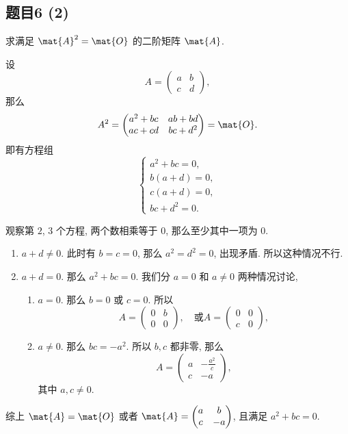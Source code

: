 \newpage
\subsection*{题目6 (2)}
\begin{problem*}
求满足 $\mat{A}^2 = \mat{O}$ 的二阶矩阵 $\mat{A}$.
\end{problem*}
\begin{solution}
设
\[
A = 
\begin{pmatrix}
    a & b \\
    c & d
\end{pmatrix},
\]
那么
\[
    A^2 = 
    \begin{pmatrix}
        a^2 + bc & ab + bd \\
        ac + cd & bc + d^2
    \end{pmatrix}
     = \mat{O}.
\]
即有方程组
\[
\begin{cases}
    a^2 + bc = 0, \\
    b(a + d) = 0, \\
    c(a + d) = 0, \\
    bc + d^2 = 0.
\end{cases}
\]

观察第 $2$, $3$ 个方程, 两个数相乘等于 $0$, 那么至少其中一项为 $0$.

\begin{enumerate}
    \item $a + d \not= 0$. 此时有 $ b = c = 0$, 那么 $a^2 = d^2 = 0$, 出现矛盾. 所以这种情况不行. 
    \item $a + d = 0$. 那么 $a^2 + bc = 0$. 我们分 $a = 0$ 和 $a \not= 0$ 两种情况讨论,
    \begin{enumerate}
        \item $a = 0$. 那么 $b = 0$ 或 $c = 0$. 所以
        \[
        A = 
        \begin{pmatrix}
            0 & b \\
            0 & 0
        \end{pmatrix},
        \quad \text{或}
        A = 
        \begin{pmatrix}
            0 & 0 \\
            c & 0
        \end{pmatrix},
        \]
        \item $a \not= 0$. 那么 $bc = -a^2$. 所以 $b, c$ 都非零, 那么
        \[
        A = 
        \begin{pmatrix}
            a & -\frac{a^2}{c} \\
            c & -a
        \end{pmatrix},
        \]
        其中 $a, c \not= 0$.
    \end{enumerate}
\end{enumerate}

综上 $\mat{A} = \mat{O}$ 或者 $\mat{A} = \begin{pmatrix}
    a & b \\
    c & -a
\end{pmatrix}$, 且满足 $a^2 + bc = 0$.
\end{solution}


